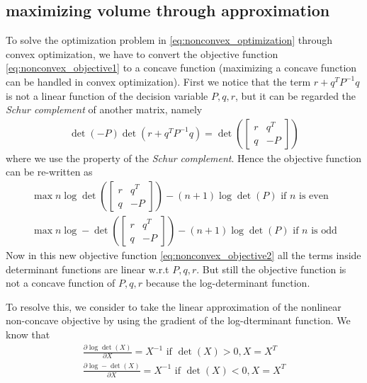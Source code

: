 \documentclass{article}
\begin{document}
\subsection{maximizing volume through approximation}
To solve the optimization problem in \eqref{eq:nonconvex_optimization} through convex optimization, we have to convert the objective function \eqref{eq:nonconvex_objective1} to a concave function (maximizing a concave function can be handled in convex optimization). First we notice that the term $r + q^TP^{-1}q$ is not a linear function of the decision variable $P, q, r$, but it can be regarded the \textit{Schur complement} of another matrix, namely 
\begin{align}
	\det(-P)\det(r+q^TP^{-1}q) = \det\left(\begin{bmatrix}r & q^T\\q & -P\end{bmatrix}\right)
\end{align}
where we use the property of the \textit{Schur complement}. Hence the objective function can be re-written as
\begin{subequations}
\begin{align}
	\max n \log\det\left(\begin{bmatrix} r & q^T\\q & -P\end{bmatrix}\right) - (n+1) \log\det(P) \text{ if $n$ is even}\\
	\max n \log-\det\left(\begin{bmatrix} r & q^T\\q & -P\end{bmatrix}\right) - (n+1) \log\det(P) \text{ if $n$ is odd}
\end{align}
\label{eq:nonconvex_objective2}
\end{subequations}
Now in this new objective function \eqref{eq:nonconvex_objective2} all the terms inside determinant functions are linear w.r.t $P, q, r$. But still the objective function is not a concave function of $P, q, r$ because the log-determinant function.

To resolve this, we consider to take the linear approximation of the nonlinear non-concave objective by using the gradient of the log-dterminant function. We know that
\begin{align}
	\frac{\partial \log\det(X)}{\partial X} = X^{-1} \text{ if } \det(X) > 0, X=X^T\\
	\frac{\partial \log-\det(X)}{\partial X} = X^{-1} \text{ if } \det(X) < 0, X=X^T
\end{align}
\end{document}
